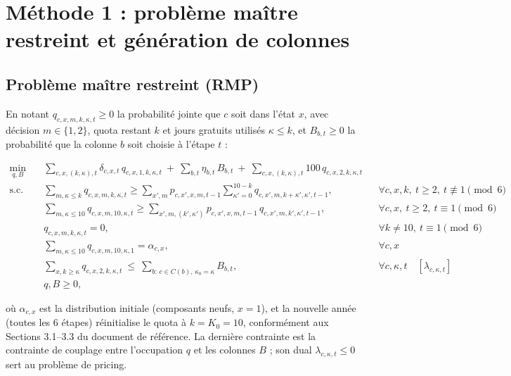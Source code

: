\documentclass[11pt]{article}
\begin{document}
\section{Méthode 1 : problème maître restreint et génération de colonnes}

\subsection{Problème maître restreint (RMP)}

En notant $q_{c,x,m,k,\kappa,t}\ge0$ la probabilité jointe que $c$ soit dans l'état $x$, avec décision
$m\in\{1,2\}$, quota restant $k$ et jours gratuits utilisés $\kappa\le k$, et $B_{b,t}\ge0$ la probabilité
que la colonne $b$ soit choisie à l'étape $t$ :

\begin{align}
\min_{q,B}\quad & \sum_{c,x,(k,\kappa),t} \delta_{c,x,t}\, q_{c,x,1,k,\kappa,t}
 \ +\ \sum_{b,t} \eta_{b,t}\, B_{b,t}
 \ +\ \sum_{c,x,(k,\kappa),t} 100\, q_{c,x,2,k,\kappa,t} \label{eq:rmp-obj}\\
\text{s.c.}\quad
 & \sum_{m,\kappa\le k} q_{c,x,m,k,\kappa,t} \ge \sum_{x',m} p_{c,x',x,m,t-1} \!\!\sum_{\kappa'=0}^{10-k}
 q_{c,x',m,k+\kappa',\kappa',t-1}, && \forall c,x,k,\ t\ge2,\ t\not\equiv1\!\!\pmod6 \label{eq:rmp-flow1}\\
 & \sum_{m,\kappa\le10} q_{c,x,m,10,\kappa,t} \ge \sum_{x',m,(k',\kappa')} p_{c,x',x,m,t-1}\,
 q_{c,x',m,k',\kappa',t-1}, && \forall c,x,\ t\ge2,\ t\equiv1\!\!\pmod6 \label{eq:rmp-flow2}\\
 & q_{c,x,m,k,\kappa,t}=0, && \forall k\ne10,\ t\equiv1\!\!\pmod6 \label{eq:rmp-reset}\\
 & \sum_{m,\kappa\le10} q_{c,x,m,10,\kappa,1} = \alpha_{c,x}, && \forall c,x \label{eq:rmp-init}\\
 & \sum_{x,k\ge\kappa} q_{c,x,2,k,\kappa,t} \ \le\ \sum_{b:\,c\in C(b),\,\kappa_b=\kappa} B_{b,t},
 && \forall c,\kappa,t\quad [\lambda_{c,\kappa,t}] \label{eq:rmp-coupling}\\
 & q,B\ge0, \nonumber
\end{align}

où $\alpha_{c,x}$ est la distribution initiale (composants neufs, $x=1$), et la nouvelle année (toutes les
6 étapes) réinitialise le quota à $k=K_0=10$, conformément aux Sections 3.1--3.3 du document de référence.
La dernière contrainte est la contrainte de couplage entre l'occupation $q$ et les colonnes $B$ ; son dual
$\lambda_{c,\kappa,t}\le0$ sert au problème de pricing.
\end{document}
